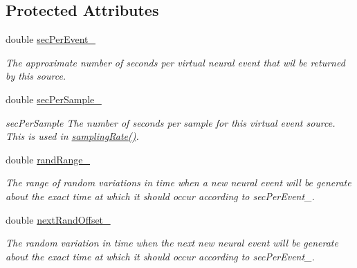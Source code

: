 \subsection*{Protected Attributes}
\begin{DoxyCompactItemize}
\item 
\hypertarget{class_simple_event_source_aa941bdcecadfa8144226afce6941d9bd}{double \hyperlink{class_simple_event_source_aa941bdcecadfa8144226afce6941d9bd}{sec\-Per\-Event\-\_\-}}\label{class_simple_event_source_aa941bdcecadfa8144226afce6941d9bd}

\begin{DoxyCompactList}\small\item\em The approximate number of seconds per virtual neural event that wil be returned by this source. \end{DoxyCompactList}\item 
\hypertarget{class_simple_event_source_aad9b175e1a1ea0546e408fa221ad9341}{double \hyperlink{class_simple_event_source_aad9b175e1a1ea0546e408fa221ad9341}{sec\-Per\-Sample\-\_\-}}\label{class_simple_event_source_aad9b175e1a1ea0546e408fa221ad9341}

\begin{DoxyCompactList}\small\item\em sec\-Per\-Sample The number of seconds per sample for this virtual event source. This is used in \hyperlink{class_simple_event_source_af095e72f6d1b1bf049635a603a0b610f}{sampling\-Rate()}. \end{DoxyCompactList}\item 
\hypertarget{class_simple_event_source_aafdea7dabd10b31e5257a5e2d594f5f9}{double \hyperlink{class_simple_event_source_aafdea7dabd10b31e5257a5e2d594f5f9}{rand\-Range\-\_\-}}\label{class_simple_event_source_aafdea7dabd10b31e5257a5e2d594f5f9}

\begin{DoxyCompactList}\small\item\em The range of random variations in time when a new neural event will be generate about the exact time at which it should occur according to sec\-Per\-Event\-\_\-. \end{DoxyCompactList}\item 
\hypertarget{class_simple_event_source_a8f5caff4b6701079145cf544bcf42d6d}{double \hyperlink{class_simple_event_source_a8f5caff4b6701079145cf544bcf42d6d}{next\-Rand\-Offset\-\_\-}}\label{class_simple_event_source_a8f5caff4b6701079145cf544bcf42d6d}

\begin{DoxyCompactList}\small\item\em The random variation in time when the next new neural event will be generate about the exact time at which it should occur according to sec\-Per\-Event\-\_\-. \end{DoxyCompactList}\end{DoxyCompactItemize}


